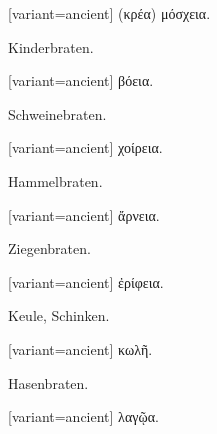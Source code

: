 \begin{greek}[variant=ancient]%
(κρέα) μόσχεια.

\end{greek}%
\egroup\switchcolumn*\bgroup

Kinderbraten. 

\egroup\switchcolumn\bgroup

\begin{greek}[variant=ancient]%
βόεια.

\end{greek}%
\egroup\switchcolumn*\bgroup

Schweinebraten. 

\egroup\switchcolumn\bgroup

\begin{greek}[variant=ancient]%
χοίρεια.

\end{greek}%
\egroup\switchcolumn*\bgroup

Hammelbraten. 

\egroup\switchcolumn\bgroup

\begin{greek}[variant=ancient]%
ἄρνεια.

\end{greek}%
\egroup\myafterpagefalse\switchcolumn*\bgroup

Ziegenbraten. 

\egroup\switchcolumn\bgroup

\begin{greek}[variant=ancient]%
ἐρίφεια.

\end{greek}%
\egroup\myafterpagefalse\switchcolumn*\bgroup

Keule, Schinken. 

\egroup\switchcolumn\bgroup

\begin{greek}[variant=ancient]%
κωλῆ.

\end{greek}%
\egroup\myafterpagefalse\switchcolumn*\bgroup

Hasenbraten. 

\egroup\switchcolumn\bgroup

\begin{greek}[variant=ancient]%
λαγῷα.

\end{greek}%
\egroup\myafterpagefalse\switchcolumn*\bgroup

